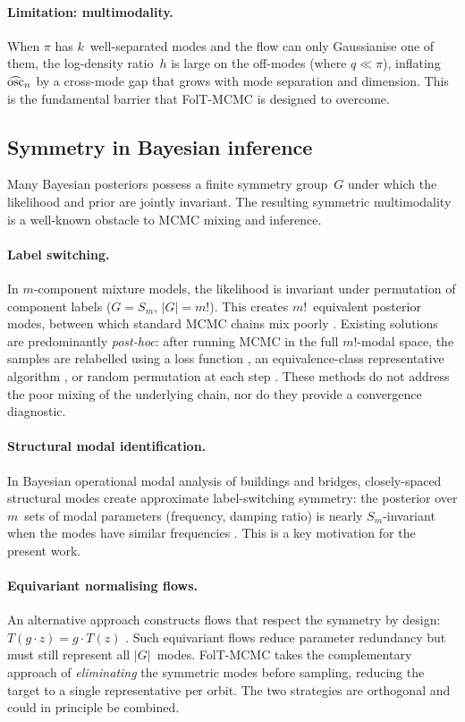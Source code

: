 \paragraph{Limitation: multimodality.}
When $\pi$ has $k$~well-separated modes and the flow can
only Gaussianise one of them, the log-density ratio~$h$
is large on the off-modes (where $q \ll \pi$), inflating
$\widehat{\mathrm{osc}}_n$ by a cross-mode gap that grows with
mode separation and dimension.
This is the fundamental barrier that FolT-MCMC is designed
to overcome.


\subsection{Symmetry in Bayesian inference}
\label{sec:bg_symmetry}

Many Bayesian posteriors possess a finite symmetry group~$G$
under which the likelihood and prior are jointly invariant.
The resulting symmetric multimodality is a well-known
obstacle to MCMC mixing and inference.

\paragraph{Label switching.}
In $m$-component mixture models, the likelihood is invariant
under permutation of component labels ($G = S_m$,
$|G| = m!$).  This creates $m!$~equivalent posterior
modes, between which standard MCMC chains mix poorly
\citep{Celeux2000,Jasra2005}.  Existing solutions are
predominantly \emph{post-hoc}: after running MCMC in
the full $m!$-modal space, the samples are relabelled
using a loss function \citep{Stephens2000}, an
equivalence-class representative algorithm
\citep{Papastamoulis2010}, or random permutation at each
step \citep{FruhwirthSchnatter2001}.  These methods do not
address the poor mixing of the underlying chain, nor do they
provide a convergence diagnostic.

\paragraph{Structural modal identification.}
In Bayesian operational modal analysis of buildings and bridges,
closely-spaced structural modes create approximate label-switching
symmetry: the posterior over $m$~sets of modal parameters
(frequency, damping ratio) is nearly $S_m$-invariant when the
modes have similar frequencies \citep{Au2011,YangLamBeck2019}.
This is a key motivation for the present work.

\paragraph{Equivariant normalising flows.}
An alternative approach constructs flows that respect the
symmetry by design: $T(g \cdot z) = g \cdot T(z)$
\citep{Kohler2020,Rezende2019}.  Such equivariant flows reduce
parameter redundancy but must still represent all $|G|$~modes.
FolT-MCMC takes the complementary approach of
\emph{eliminating} the symmetric modes before sampling,
reducing the target to a single representative per orbit.
The two strategies are orthogonal and could in principle be
combined.
